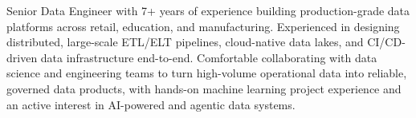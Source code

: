 
\begin{cvparagraph}

Senior Data Engineer with 7+ years of experience building production-grade data platforms across retail, education, and manufacturing. Experienced in designing distributed, large-scale ETL/ELT pipelines, cloud-native data lakes, and CI/CD-driven data infrastructure end-to-end. Comfortable collaborating with data science and engineering teams to turn high-volume operational data into reliable, governed data products, with hands-on machine learning project experience and an active interest in AI-powered and agentic data systems.

\end{cvparagraph}